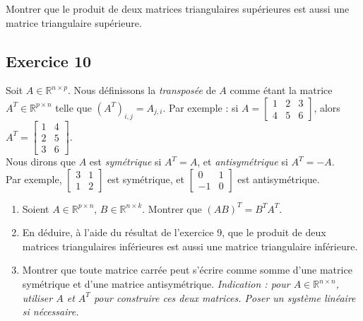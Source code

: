 \documentclass{article}
\newcommand{\R}{\mathbb{R}}
\newcommand{\cross}{\times}
\begin{document}
\noindent Montrer que le produit de deux matrices triangulaires supérieures est aussi une matrice triangulaire supérieure.

\subsection*{Exercice 10}
\noindent Soit $A \in \R^{n \cross p}$. Nous définissons la \textit{transposée} de $A$ comme étant la matrice $A^T \in \R^{p \cross n}$ telle que $(A^T)_{i,j} = A_{j,i}$. 
Par exemple : si $A = \begin{bmatrix}
1 & 2 & 3\\
4 & 5 & 6
\end{bmatrix}$, alors $A^T = \begin{bmatrix}
1 & 4\\
2 & 5 \\
3 & 6
\end{bmatrix}$.\\

\noindent Nous dirons que $A$ est \textit{symétrique} si $A^T=A$, et \textit{antisymétrique} si $A^T=-A$. \\
Par exemple, $\begin{bmatrix} 3 & 1 \\ 1 & 2 \end{bmatrix}$ est symétrique, et $\begin{bmatrix} 0 & 1 \\ -1 & 0 \end{bmatrix}$ est antisymétrique. \\

\begin{enumerate}
    \item Soient $A \in \R^{p \cross n}$, $B \in \R^{n \cross k}$. Montrer que $(AB)^T = B^T A^T$.
    \item En déduire, à l'aide du résultat de l'exercice 9, que le produit de deux matrices triangulaires inférieures est aussi une matrice triangulaire inférieure.
    \item Montrer que toute matrice carrée peut s'écrire comme somme d'une matrice symétrique et d'une matrice antisymétrique. \textit{Indication : pour $A \in \R^{n \cross n}$, utiliser $A$ et $A^T$ pour construire ces deux matrices. Poser un système linéaire si nécessaire.}
\end{enumerate}

\end{document}

